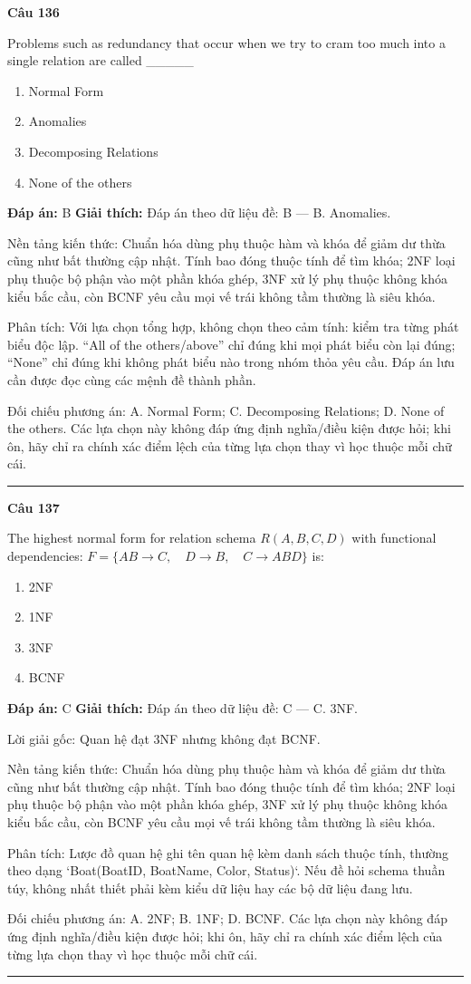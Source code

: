 \documentclass[11pt,a4paper]{article}
\newenvironment{question}[1]{%
  \par\vspace{1em}\noindent\textbf{\large Câu #1}\par\vspace{0.4em}
}{%
  \par\vspace{1em}\hrule\vspace{0.6em}
}
\newenvironment{choices}{%
  \begin{enumerate}[label=\textbf{\Alph*.},leftmargin=2.2em,itemsep=2pt,topsep=3pt]
}{%
  \end{enumerate}
}
\newcommand{\choice}{\item}
\begin{document}
\begin{question}{136}
Problems such as redundancy that occur when we try to cram too much into a single relation are called _____
\begin{choices}
\choice Normal Form
\choice Anomalies
\choice Decomposing Relations
\choice None of the others
\end{choices}
\textbf{Đáp án:} B
\textbf{Giải thích:} Đáp án theo dữ liệu đề: B — B. Anomalies.

Nền tảng kiến thức: Chuẩn hóa dùng phụ thuộc hàm và khóa để giảm dư thừa cũng như bất thường cập nhật. Tính bao đóng thuộc tính để tìm khóa; 2NF loại phụ thuộc bộ phận vào một phần khóa ghép, 3NF xử lý phụ thuộc không khóa kiểu bắc cầu, còn BCNF yêu cầu mọi vế trái không tầm thường là siêu khóa.

Phân tích: Với lựa chọn tổng hợp, không chọn theo cảm tính: kiểm tra từng phát biểu độc lập. “All of the others/above” chỉ đúng khi mọi phát biểu còn lại đúng; “None” chỉ đúng khi không phát biểu nào trong nhóm thỏa yêu cầu. Đáp án lưu cần được đọc cùng các mệnh đề thành phần.

Đối chiếu phương án: A. Normal Form; C. Decomposing Relations; D. None of the others. Các lựa chọn này không đáp ứng định nghĩa/điều kiện được hỏi; khi ôn, hãy chỉ ra chính xác điểm lệch của từng lựa chọn thay vì học thuộc mỗi chữ cái.
\end{question}

\begin{question}{137}
The highest normal form for relation schema \(R(A, B, C, D)\) with functional dependencies:
\(F = \{ AB \rightarrow C, \quad D \rightarrow B, \quad C \rightarrow ABD \}\) is:
\begin{choices}
\choice 2NF
\choice 1NF
\choice 3NF
\choice BCNF
\end{choices}
\textbf{Đáp án:} C
\textbf{Giải thích:} Đáp án theo dữ liệu đề: C — C. 3NF.

Lời giải gốc: Quan hệ đạt 3NF nhưng không đạt BCNF.

Nền tảng kiến thức: Chuẩn hóa dùng phụ thuộc hàm và khóa để giảm dư thừa cũng như bất thường cập nhật. Tính bao đóng thuộc tính để tìm khóa; 2NF loại phụ thuộc bộ phận vào một phần khóa ghép, 3NF xử lý phụ thuộc không khóa kiểu bắc cầu, còn BCNF yêu cầu mọi vế trái không tầm thường là siêu khóa.

Phân tích: Lược đồ quan hệ ghi tên quan hệ kèm danh sách thuộc tính, thường theo dạng `Boat(BoatID, BoatName, Color, Status)`. Nếu đề hỏi schema thuần túy, không nhất thiết phải kèm kiểu dữ liệu hay các bộ dữ liệu đang lưu.

Đối chiếu phương án: A. 2NF; B. 1NF; D. BCNF. Các lựa chọn này không đáp ứng định nghĩa/điều kiện được hỏi; khi ôn, hãy chỉ ra chính xác điểm lệch của từng lựa chọn thay vì học thuộc mỗi chữ cái.
\end{question}
\end{document}
